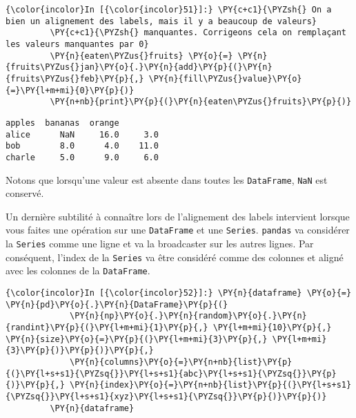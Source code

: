     \begin{Verbatim}[commandchars=\\\{\},frame=single,framerule=0.3mm,rulecolor=\color{cellframecolor}]
{\color{incolor}In [{\color{incolor}51}]:} \PY{c+c1}{\PYZsh{} On a bien un alignement des labels, mais il y a beaucoup de valeurs}
         \PY{c+c1}{\PYZsh{} manquantes. Corrigeons cela on remplaçant les valeurs manquantes par 0}
         \PY{n}{eaten\PYZus{}fruits} \PY{o}{=} \PY{n}{fruits\PYZus{}jan}\PY{o}{.}\PY{n}{add}\PY{p}{(}\PY{n}{fruits\PYZus{}feb}\PY{p}{,} \PY{n}{fill\PYZus{}value}\PY{o}{=}\PY{l+m+mi}{0}\PY{p}{)}
         \PY{n+nb}{print}\PY{p}{(}\PY{n}{eaten\PYZus{}fruits}\PY{p}{)}
\end{Verbatim}


    \begin{Verbatim}[commandchars=\\\{\},frame=single,framerule=0.3mm,rulecolor=\color{cellframecolor}]
        apples  bananas  orange
alice      NaN     16.0     3.0
bob        8.0      4.0    11.0
charle     5.0      9.0     6.0
\end{Verbatim}

    Notons que lorsqu'une valeur est absente dans toutes les
\texttt{DataFrame}, \texttt{NaN} est conservé.

    Un dernière subtilité à connaître lors de l'alignement des labels
intervient lorsque vous faites une opération sur une \texttt{DataFrame}
et une \texttt{Series}. \texttt{pandas} va considérer la \texttt{Series}
comme une ligne et va la broadcaster sur les autres lignes. Par
conséquent, l'index de la \texttt{Series} va être considéré comme des
colonnes et aligné avec les colonnes de la \texttt{DataFrame}.

    \begin{Verbatim}[commandchars=\\\{\},frame=single,framerule=0.3mm,rulecolor=\color{cellframecolor}]
{\color{incolor}In [{\color{incolor}52}]:} \PY{n}{dataframe} \PY{o}{=} \PY{n}{pd}\PY{o}{.}\PY{n}{DataFrame}\PY{p}{(}
             \PY{n}{np}\PY{o}{.}\PY{n}{random}\PY{o}{.}\PY{n}{randint}\PY{p}{(}\PY{l+m+mi}{1}\PY{p}{,} \PY{l+m+mi}{10}\PY{p}{,} \PY{n}{size}\PY{o}{=}\PY{p}{(}\PY{l+m+mi}{3}\PY{p}{,} \PY{l+m+mi}{3}\PY{p}{)}\PY{p}{)}\PY{p}{,}
             \PY{n}{columns}\PY{o}{=}\PY{n+nb}{list}\PY{p}{(}\PY{l+s+s1}{\PYZsq{}}\PY{l+s+s1}{abc}\PY{l+s+s1}{\PYZsq{}}\PY{p}{)}\PY{p}{,} \PY{n}{index}\PY{o}{=}\PY{n+nb}{list}\PY{p}{(}\PY{l+s+s1}{\PYZsq{}}\PY{l+s+s1}{xyz}\PY{l+s+s1}{\PYZsq{}}\PY{p}{)}\PY{p}{)}
         \PY{n}{dataframe}
\end{Verbatim}


